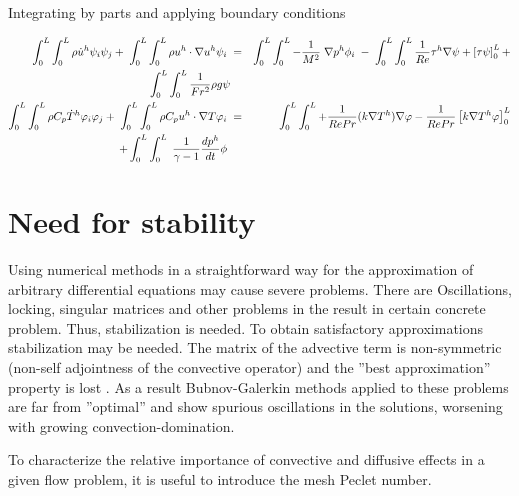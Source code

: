 Integrating by parts and applying boundary conditions

\begin{eqnarray*}
\int_{0}^{L} \int_{0}^{L}\rho \dot{u}^h \psi_i \psi_j + \hspace{1mm}\int_{0}^{L} \int_{0}^{L} \rho u^h \cdot \nabla u^h \psi_i \hspace{1mm} &=& \int_{0}^{L} \int_{0}^{L}  -\frac{1}{M^2}\hspace{1mm}\nabla p^h \phi_i \hspace{1mm} - \hspace{1mm}\int_{0}^{L} \int_{0}^{L}\frac{1}{Re} \tau^h \nabla \psi + \left[\tau \psi \right]_0^L+ \\ \int_{0}^{L} \int_{0}^{L}\frac{1}{Fr^2}\rho g \psi \\
\int_{0}^{L} \int_{0}^{L} \rho C_p \dot{T}^h \varphi_i \varphi_j + \hspace{1mm}\int_{0}^{L} \int_{0}^{L} \rho C_p u^h \cdot \nabla T \varphi_i \hspace{1mm}&=&\hspace{1mm} \int_{0}^{L} \int_{0}^{L} +  \frac{1}{Re Pr}(k \nabla T^h) \nabla \varphi  -  \frac{1}{Re Pr} \left[k \nabla T^h \varphi \right]_0^L \\ + \int_{0}^{L} \int_{0}^{L} \hspace{1mm} \frac{1}{\gamma -1} \frac{d p^h}{d t} \phi\hspace{1mm} \\
\end{eqnarray*}

\section{Need for stability}
Using numerical methods in a straightforward way for the approximation of arbitrary differential
equations may cause severe problems. There are Oscillations, locking, singular matrices and other problems in the result in certain concrete problem.
Thus, stabilization is needed. To obtain satisfactory approximations stabilization may be needed. The matrix of the advective term is non-symmetric (non-self adjointness of the convective operator) and the ”best approximation” property is lost . As a result Bubnov-Galerkin methods applied to these problems are far from ”optimal” and show spurious oscillations in the solutions, worsening with growing convection-domination. 

 To characterize the relative importance of convective and diffusive effects in a given flow
problem, it is useful to introduce the mesh Peclet number.

